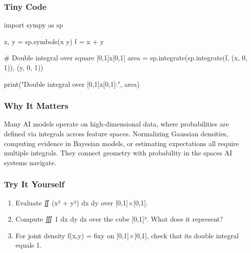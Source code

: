 \documentclass[
  letterpaper,
  DIV=11,
  numbers=noendperiod]{scrreprt}
\newenvironment{Shaded}{\begin{snugshade}}{\end{snugshade}}
\newcommand{\BuiltInTok}[1]{\textcolor[rgb]{0.00,0.23,0.31}{#1}}
\newcommand{\CommentTok}[1]{\textcolor[rgb]{0.37,0.37,0.37}{#1}}
\newcommand{\DecValTok}[1]{\textcolor[rgb]{0.68,0.00,0.00}{#1}}
\newcommand{\ImportTok}[1]{\textcolor[rgb]{0.00,0.46,0.62}{#1}}
\newcommand{\NormalTok}[1]{\textcolor[rgb]{0.00,0.23,0.31}{#1}}
\newcommand{\OperatorTok}[1]{\textcolor[rgb]{0.37,0.37,0.37}{#1}}
\newcommand{\StringTok}[1]{\textcolor[rgb]{0.13,0.47,0.30}{#1}}
\providecommand{\tightlist}{%
  \setlength{\itemsep}{0pt}\setlength{\parskip}{0pt}}
\begin{document}
\subsubsection{Tiny Code}\label{tiny-code-117}

\begin{Shaded}
\begin{Highlighting}[]
\ImportTok{import}\NormalTok{ sympy }\ImportTok{as}\NormalTok{ sp}

\NormalTok{x, y }\OperatorTok{=}\NormalTok{ sp.symbols(}\StringTok{\textquotesingle{}x y\textquotesingle{}}\NormalTok{)}
\NormalTok{f }\OperatorTok{=}\NormalTok{ x }\OperatorTok{+}\NormalTok{ y}

\CommentTok{\# Double integral over square [0,1]x[0,1]}
\NormalTok{area }\OperatorTok{=}\NormalTok{ sp.integrate(sp.integrate(f, (x, }\DecValTok{0}\NormalTok{, }\DecValTok{1}\NormalTok{)), (y, }\DecValTok{0}\NormalTok{, }\DecValTok{1}\NormalTok{))}

\BuiltInTok{print}\NormalTok{(}\StringTok{"Double integral over [0,1]x[0,1]:"}\NormalTok{, area)}
\end{Highlighting}
\end{Shaded}

\subsubsection{Why It Matters}\label{why-it-matters-15}

Many AI models operate on high-dimensional data, where probabilities are
defined via integrals across feature spaces. Normalizing Gaussian
densities, computing evidence in Bayesian models, or estimating
expectations all require multiple integrals. They connect geometry with
probability in the spaces AI systems navigate.

\subsubsection{Try It Yourself}\label{try-it-yourself-117}

\begin{enumerate}
\def\labelenumi{\arabic{enumi}.}
\tightlist
\item
  Evaluate ∬ (x² + y²) dx dy over {[}0,1{]}×{[}0,1{]}.
\item
  Compute ∭ 1 dx dy dz over the cube {[}0,1{]}³. What does it represent?
\item
  For joint density f(x,y) = 6xy on {[}0,1{]}×{[}0,1{]}, check that its
  double integral equals 1.
\end{enumerate}
\end{document}
